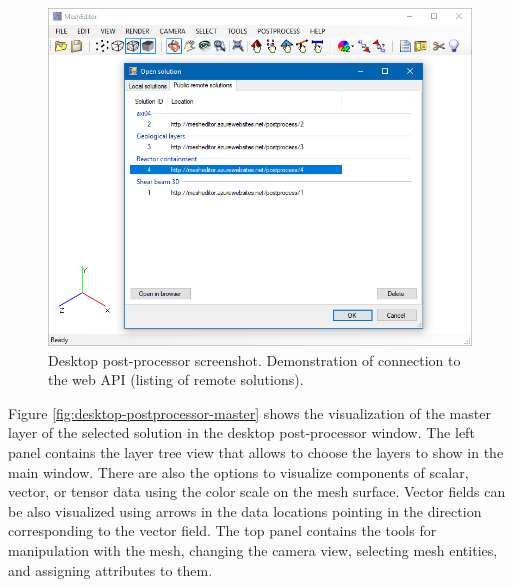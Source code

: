 \begin{figure}[H]
    \centering
    \includegraphics[width=\textwidth]{figures/chapter-data-management/desktop-postprocessor-remote-solutions}
    \decoRule
    \caption[Desktop post-processor screenshot. List of remote solutions.]{Desktop post-processor screenshot. Demonstration of connection to the web API (listing of remote solutions).}
    \label{fig:desktop-postprocessor-remote-solutions}
\end{figure}

Figure \ref{fig:desktop-postprocessor-master} shows the visualization of the master layer of the selected solution in the desktop post-processor window. The left panel contains the layer tree view that allows to choose the layers to show in the main window. There are also the options to visualize components of scalar, vector, or tensor data using the color scale on the mesh surface. Vector fields can be also visualized using arrows in the data locations pointing in the direction corresponding to the vector field. The top panel contains the tools for manipulation with the mesh, changing the camera view, selecting mesh entities, and assigning attributes to them.


